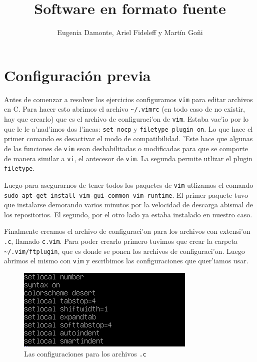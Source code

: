 \documentclass[11pt]{article}
\title{\Huge Software en formato fuente}
\author{Eugenia Damonte, Ariel Fideleff y Mart\'in Go\~ni}
\date{}
\begin{document}
	\maketitle
	\newpage
	\tableofcontents
	\newpage
	
	
	\section{Configuraci\'on previa}
		Antes de comenzar a resolver los ejercicios configuramos \texttt{vim} para editar archivos en C. Para hacer esto abrimos el archivo \texttt{\textasciitilde/.vimrc} (en todo caso de no existir, hay que crearlo) que es el archivo de configuraci'on de \texttt{vim}. Estaba vac'io por lo que le le a'nad'imos dos l'ineas: \texttt{set nocp} y \texttt{filetype plugin on}. Lo que hace el primer comando es desactivar el modo de compatibilidad. 'Este hace que algunas de las funciones de \texttt{vim} sean deshabilitadas o modificadas para que se comporte de manera similar a \texttt{vi}, el antecesor de \texttt{vim}. La segunda permite utlizar el plugin \texttt{filetype}.
		
		Luego para asegurarnos de tener todos los paquetes de \texttt{vim} utlizamos el comando \texttt{sudo apt-get install vim-gui-common vim-runtime}. El primer paquete tuvo que instalarse demorando varios minutos por la velocidad de descarga abismal de los repositorios. El segundo, por el otro lado ya estaba instalado en nuestro caso.
		
		Finalmente creamos el archivo de configuraci'on para los archivos con extensi'on \texttt{.c}, llamado \texttt{c.vim}. Para poder crearlo primero tuvimos que crear la carpeta \texttt{\textasciitilde/.vim/ftplugin}, que es donde se ponen los archivos de configuraci'on. Luego abrimos el mismo con \texttt{vim} y escribimos las configuraciones que quer'iamos usar.
		
		
		\begin{figure}[H]
			\centering
			\includegraphics[width=.7\linewidth]{Images/Preamble/Preamble.PNG}
			\caption{Las configuraciones para los archivos \texttt{.c}}
			\label{fig:vim-setup}
		\end{figure}
		
\end{document}

